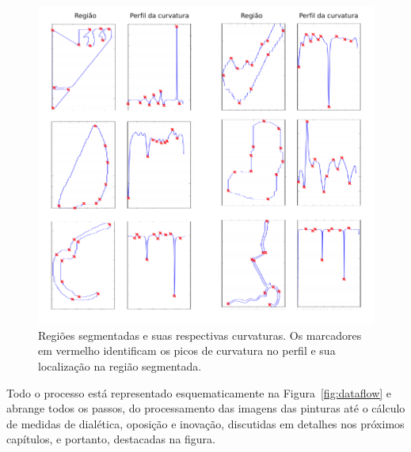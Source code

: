 \begin{figure}[ht!]
\begin{center}
        \includegraphics[scale=1]{figs/passos_curvatura}
      \caption{Regiões segmentadas e suas respectivas curvaturas. Os
        marcadores em vermelho identificam os picos de curvatura no
        perfil e sua localização na região segmentada.}
        \label{fig:passos_curvatura}
\end{center}
\end{figure}

Todo o processo está representado esquematicamente na Figura~\ref{fig:dataflow}
e abrange todos os passos, do processamento das imagens das pinturas até o
cálculo de medidas de dialética, oposição e inovação, discutidas em detalhes nos
próximos capítulos, e portanto, destacadas na figura.

